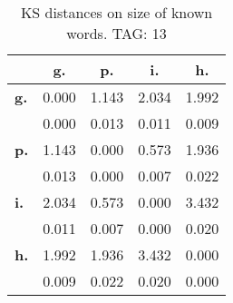 \begin{table}[h!]
\begin{center}
\begin{tabular}{| l || c | c | c | c |}\hline
 & {\bf g.} & {\bf p.} & {\bf i.} & {\bf h.} \\\hline\hline
{\bf g.} & 0.000 & 1.143 & 2.034 & 1.992 \\
{\bf } & 0.000 & 0.013 & 0.011 & 0.009 \\\hline
{\bf p.} & 1.143 & 0.000 & 0.573 & 1.936 \\
{\bf } & 0.013 & 0.000 & 0.007 & 0.022 \\\hline
{\bf i.} & 2.034 & 0.573 & 0.000 & 3.432 \\
{\bf } & 0.011 & 0.007 & 0.000 & 0.020 \\\hline
{\bf h.} & 1.992 & 1.936 & 3.432 & 0.000 \\
{\bf } & 0.009 & 0.022 & 0.020 & 0.000 \\\hline
\end{tabular}
\caption{KS distances on size of known words. TAG: 13}
\end{center}
\end{table}